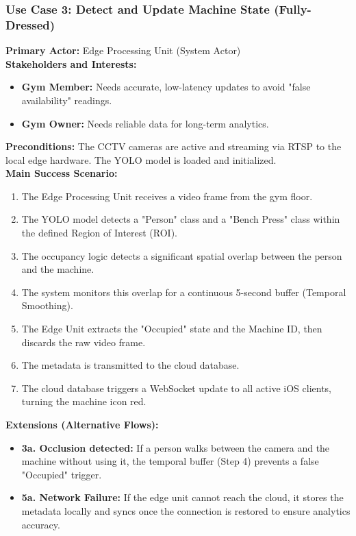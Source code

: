 \subsubsection{Use Case 3: Detect and Update Machine State (Fully-Dressed)}
\textbf{Primary Actor:} Edge Processing Unit (System Actor) \\
\textbf{Stakeholders and Interests:}
\begin{itemize}
    \item \textbf{Gym Member:} Needs accurate, low-latency updates to avoid "false availability" readings.
    \item \textbf{Gym Owner:} Needs reliable data for long-term analytics.
\end{itemize}
\textbf{Preconditions:} The CCTV cameras are active and streaming via RTSP to the local edge hardware. The YOLO model is loaded and initialized. \\
\textbf{Main Success Scenario:}
\begin{enumerate}
    \item The Edge Processing Unit receives a video frame from the gym floor.
    \item The YOLO model detects a "Person" class and a "Bench Press" class within the defined Region of Interest (ROI).
    \item The occupancy logic detects a significant spatial overlap between the person and the machine.
    \item The system monitors this overlap for a continuous 5-second buffer (Temporal Smoothing).
    \item The Edge Unit extracts the "Occupied" state and the Machine ID, then discards the raw video frame.
    \item The metadata is transmitted to the cloud database.
    \item The cloud database triggers a WebSocket update to all active iOS clients, turning the machine icon red.
\end{enumerate}
\textbf{Extensions (Alternative Flows):}
\begin{itemize}
    \item \textbf{3a. Occlusion detected:} If a person walks between the camera and the machine without using it, the temporal buffer (Step 4) prevents a false "Occupied" trigger.
    \item \textbf{5a. Network Failure:} If the edge unit cannot reach the cloud, it stores the metadata locally and syncs once the connection is restored to ensure analytics accuracy.
\end{itemize}

